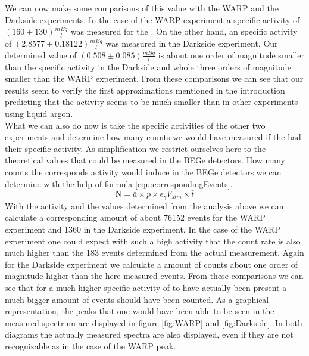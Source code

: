 We can now make some comparisons of this value with the WARP and the Darkside experiments.
In the case of the WARP experiment a specific activity of $(160\pm130)\frac{\unit{mBq}}{\unit{l}}$ \label{} was measured for the \Kr.
On the other hand, an specific activity of $(2.8577 \pm 0.18122) \frac{\unit{mBq}}{\unit{l}}$ was measured in the Darkside experiment.
Our determined value of $(0.508\pm0.085)\frac{\unit{mBq}}{\unit{l}}$ is about one order of magnitude smaller than the specific activity in the Darkside and whole three orders of magnitude smaller than the WARP experiment.
From these comparisons we can see that our results seem to verify the first approximations mentioned in the introduction predicting that the \Kr activity seems to be much smaller than in other experiments using liquid argon.
\\

What we can also do now is take the specific activities of the other two experiments and determine how many counts we would have measured if the \Kr had their specific activity.
As simplification we restrict ourselves here to the theoretical values that could be measured in the BEGe detectors. 
How many counts the corresponds activity would induce in the BEGe detectors we can determine with the help of formula \ref{equ:correspondingEvents}.
\begin{equation}
\mathrm{N} = \bar{a} \times p \times \epsilon_\gamma V_{sim} \times \bar{t}
\label{equ:correspondingEvents}
\end{equation}
With the activity and the values determined from the analysis above we can calculate a corresponding amount of about 76152 events for the WARP experiment and 1360 in the Darkside experiment.
In the case of the WARP experiment one could expect with such a high activity that the count rate is also much higher than the 183 events determined from the actual measurement.
Again for the Darkside experiment we calculate a amount of counts about one order of magnitude higher than the here measured events.
From these comparisons we can see that for a much higher specific activity of \Kr to have actually been present a much bigger amount of events should have been counted.
As a graphical representation, the peaks that one would have been able to be seen in the measured spectrum are displayed in figure \ref{fig:WARP} and \ref{fig:Darkside}.
In both diagrams the actually measured spectra are also displayed, even if they are not recognizable as in the case of the WARP peak.
\\

